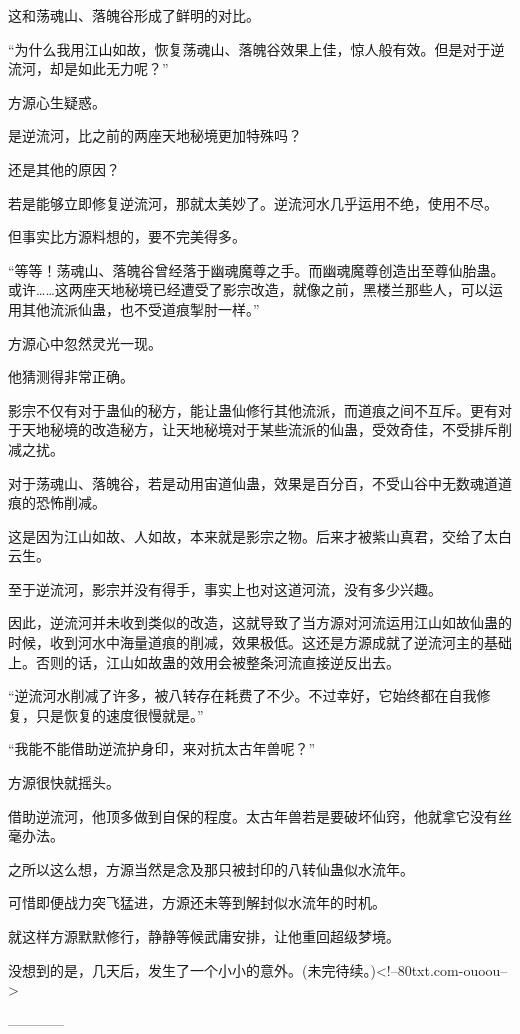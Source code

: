 \begin{this_body}
这和荡魂山、落魄谷形成了鲜明的对比。

“为什么我用江山如故，恢复荡魂山、落魄谷效果上佳，惊人般有效。但是对于逆流河，却是如此无力呢？”

方源心生疑惑。

是逆流河，比之前的两座天地秘境更加特殊吗？

还是其他的原因？

若是能够立即修复逆流河，那就太美妙了。逆流河水几乎运用不绝，使用不尽。

但事实比方源料想的，要不完美得多。

“等等！荡魂山、落魄谷曾经落于幽魂魔尊之手。而幽魂魔尊创造出至尊仙胎蛊。或许……这两座天地秘境已经遭受了影宗改造，就像之前，黑楼兰那些人，可以运用其他流派仙蛊，也不受道痕掣肘一样。”

方源心中忽然灵光一现。

他猜测得非常正确。

影宗不仅有对于蛊仙的秘方，能让蛊仙修行其他流派，而道痕之间不互斥。更有对于天地秘境的改造秘方，让天地秘境对于某些流派的仙蛊，受效奇佳，不受排斥削减之扰。

对于荡魂山、落魄谷，若是动用宙道仙蛊，效果是百分百，不受山谷中无数魂道道痕的恐怖削减。

这是因为江山如故、人如故，本来就是影宗之物。后来才被紫山真君，交给了太白云生。

至于逆流河，影宗并没有得手，事实上也对这道河流，没有多少兴趣。

因此，逆流河并未收到类似的改造，这就导致了当方源对河流运用江山如故仙蛊的时候，收到河水中海量道痕的削减，效果极低。这还是方源成就了逆流河主的基础上。否则的话，江山如故蛊的效用会被整条河流直接逆反出去。

“逆流河水削减了许多，被八转存在耗费了不少。不过幸好，它始终都在自我修复，只是恢复的速度很慢就是。”

“我能不能借助逆流护身印，来对抗太古年兽呢？”

方源很快就摇头。

借助逆流河，他顶多做到自保的程度。太古年兽若是要破坏仙窍，他就拿它没有丝毫办法。

之所以这么想，方源当然是念及那只被封印的八转仙蛊似水流年。

可惜即便战力突飞猛进，方源还未等到解封似水流年的时机。

就这样方源默默修行，静静等候武庸安排，让他重回超级梦境。

没想到的是，几天后，发生了一个小小的意外。(未完待续。)<!--80txt.com-ouoou-->

------------

\end{this_body}

